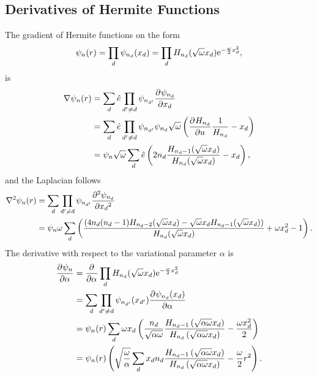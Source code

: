 
\chapter{\label{appendix:B}}

\section{Derivatives of Hermite Functions}
    The gradient of Hermite functions on the form
        \begin{equation}
            \psi_n(r) = \prod_d \psi_{n_d}(x_d) = \prod_d
            H_{n_d}(\sqrt{\omega}x_d)\mathrm{e}^{-\frac{\omega}{2}x^2_d},
        \end{equation}
    is
        \begin{align}
            \nabla \psi_n(r) &= \sum_d\hat{e} \prod_{d'\neq d} \psi_{n_{d'}}
            \prd{x_d}[\psi_{n_d}] \nonumber \\
            &= \sum_d\hat{e} \prod_{d'\neq d} \psi_{n_{d'}} \psi_{n_d}
            \sqrt{\omega} \left(\prd{u}[H_{n_d}]\frac{1}{H_{n_d}} - x_d\right)
            \nonumber \\
            &= \psi_n\sqrt{\omega}\sum_d \hat{e}
            \left(2n_d\frac{H_{n_d-1}(\sqrt{\omega}x_d)}
            {H_{n_d}(\sqrt{\omega}x_d)} - x_d\right),
        \end{align}
    and the Laplacian follows
        \begin{align}
            \nabla^2 \psi_n(r) &= \sum_d \prod_{d'\neq d} \psi_{n_{d'}}
            \prd{x_d}[\psi_{n_d}][2] \nonumber \\
            &= \psi_n\omega\sum_d
            \left(\frac{\left(4n_d(n_d-1)H_{n_d-2}(\sqrt{\omega}x_d) -
            \sqrt{\omega}x_dH_{n_d-1}(\sqrt{\omega}x_d)\right)}
            {H_{n_d}(\sqrt{\omega}x_d)} + \omega x^2_d - 1\right).
        \end{align}
    The derivative with respect to the variational parameter $\alpha$ is
        \begin{align}
            \prd{\alpha}[\psi_n] &= \prd{\alpha} \prod_d
            H_{n_d}(\sqrt{\omega}x_d)\me^{-\frac{\omega}{2}x^2_d} \nonumber \\
            &= \sum_d \prod_{d'\neq d} \psi_{n_{d'}}(x_{d'})
            \prd{\alpha}[\psi_{n_d}(x_d)] \nonumber \\
            &= \psi_n(r)\sum_d \omega x_d\left(\frac{n_d}{\sqrt{\alpha\omega}}
            \frac{H_{n_d-1}\left(\sqrt{\alpha\omega}x_d\right)}
            {H_{n_d}\left(\sqrt{\alpha\omega}x_d\right)} - \frac{\omega
            x^2_d}{2}\right) \nonumber \\
            &= \psi_n(r)\left(\sqrt{\frac{\omega}{\alpha}} \sum_d x_dn_d
            \frac{H_{n_d-1}\left(\sqrt{\alpha\omega}x_d\right)}
            {H_{n_d}\left(\sqrt{\alpha\omega}x_d\right)} -
            \frac{\omega}{2}r^2\right).
        \end{align}

